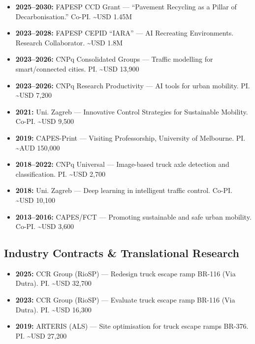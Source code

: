 \documentclass[
  10pt,
  a4paper,
  DIV=11,
  numbers=noendperiod]{scrartcl}
\providecommand{\tightlist}{%
  \setlength{\itemsep}{0pt}\setlength{\parskip}{0pt}}
\begin{document}
\begin{itemize}
\tightlist
\item
  \textbf{2025--2030:} FAPESP CCD Grant --- ``Pavement Recycling as a
  Pillar of Decarbonisation.'' Co-PI. \textasciitilde USD 1.45M
\item
  \textbf{2023--2028:} FAPESP CEPID ``IARA'' --- AI Recreating
  Environments. Research Collaborator. \textasciitilde USD 1.8M
\item
  \textbf{2023--2026:} CNPq Consolidated Groups --- Traffic modelling
  for smart/connected cities. PI. \textasciitilde USD 13,900
\item
  \textbf{2023--2026:} CNPq Research Productivity --- AI tools for urban
  mobility. PI. \textasciitilde USD 7,200
\item
  \textbf{2021:} Uni. Zagreb --- Innovative Control Strategies for
  Sustainable Mobility. Co-PI. \textasciitilde USD 9,500
\item
  \textbf{2019:} CAPES-Print --- Visiting Professorship, University of
  Melbourne. PI. \textasciitilde AUD 150,000
\item
  \textbf{2018--2022:} CNPq Universal --- Image-based truck axle
  detection and classification. PI. \textasciitilde USD 2,700
\item
  \textbf{2018:} Uni. Zagreb --- Deep learning in intelligent traffic
  control. Co-PI. \textasciitilde USD 10,100
\item
  \textbf{2013--2016:} CAPES/FCT --- Promoting sustainable and safe
  urban mobility. Co-PI. \textasciitilde USD 3,600
\end{itemize}

\subsection{Industry Contracts \& Translational
Research}\label{industry-contracts-translational-research}

\begin{itemize}
\tightlist
\item
  \textbf{2025:} CCR Group (RioSP) --- Redesign truck escape ramp BR-116
  (Via Dutra). PI. \textasciitilde USD 32,700
\item
  \textbf{2023:} CCR Group (RioSP) --- Evaluate truck escape ramp BR-116
  (Via Dutra). PI. \textasciitilde USD 16,300
\item
  \textbf{2019:} ARTERIS (ALS) --- Site optimisation for truck escape
  ramps BR-376. PI. \textasciitilde USD 27,200
\end{itemize}
\end{document}
